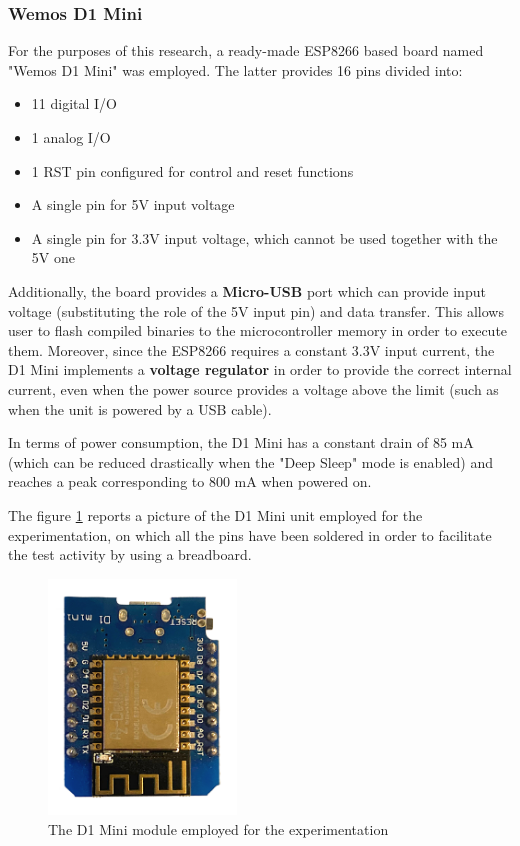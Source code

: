\subsubsection{Wemos D1 Mini}\label{subsubsec:d1mini}

For the purposes of this research, a ready-made ESP8266 based board named "Wemos D1 Mini" was employed. The latter provides 16 pins divided into:

\begin{itemize}
    \item 11 digital I/O
    \item 1 analog I/O
    \item 1 RST pin configured for control and reset functions
    \item A single pin for 5V input voltage
    \item A single pin for 3.3V input voltage, which cannot be used together with the 5V one
\end{itemize}

Additionally, the board provides a \textbf{Micro-USB} port which can provide input voltage (substituting the role of the 5V input pin) and data transfer. This allows user to flash compiled binaries to the microcontroller memory in order to execute them. Moreover, since the ESP8266 requires a constant 3.3V input current, the D1 Mini implements a \textbf{voltage regulator} in order to provide the correct internal current, even when the power source provides a voltage above the limit (such as when the unit is powered by a USB cable).

In terms of power consumption, the D1 Mini has a constant drain of 85 mA (which can be reduced drastically when the "Deep Sleep" mode is enabled) and reaches a peak corresponding to 800 mA when powered on.

The figure \ref{fig:d1mini} reports a picture of the D1 Mini unit employed for the experimentation, on which all the pins have been soldered in order to facilitate the test activity by using a breadboard.

\begin{figure}[h]
    \centering
    \includegraphics[width=5cm]{./images/d1mini.png}
    \caption{The D1 Mini module employed for the experimentation}
    \label{fig:d1mini}
\end{figure}

